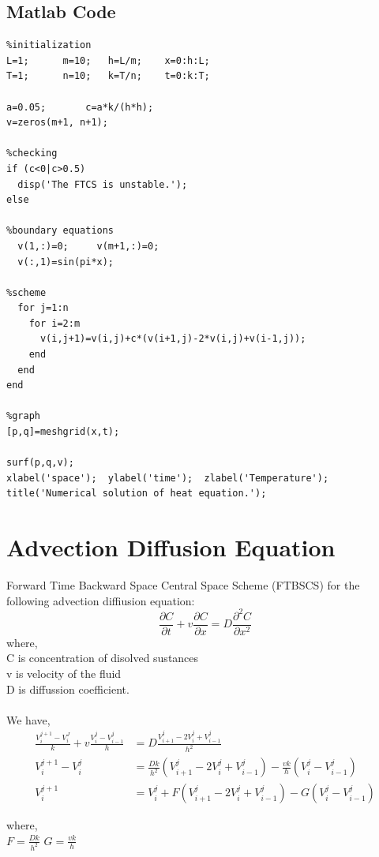 \section{Matlab Code}
  \begin{verbatim}
%initialization
L=1;      m=10;   h=L/m;    x=0:h:L;
T=1;      n=10;   k=T/n;    t=0:k:T;

a=0.05;       c=a*k/(h*h);
v=zeros(m+1, n+1);

%checking
if (c<0|c>0.5)
  disp('The FTCS is unstable.');
else

%boundary equations
  v(1,:)=0;     v(m+1,:)=0;
  v(:,1)=sin(pi*x);

%scheme
  for j=1:n
    for i=2:m
      v(i,j+1)=v(i,j)+c*(v(i+1,j)-2*v(i,j)+v(i-1,j));
    end
  end
end

%graph
[p,q]=meshgrid(x,t);

surf(p,q,v);
xlabel('space');  ylabel('time');  zlabel('Temperature');
title('Numerical solution of heat equation.');
\end{verbatim}

\chapter{Advection Diffusion Equation}
Forward Time Backward Space Central Space Scheme (FTBSCS) for the following advection diffiusion equation:\\
\[\frac{\partial C}{\partial t} + v\frac{\partial C}{\partial x} = D\frac{\partial^2 C}{\partial x^2}\]
where,\\
C is concentration of disolved sustances \\
v is velocity of the fluid \\
D is diffussion coefficient. \\ \\

We have,
\begin{align*}
  \frac{V_i^{j+1}-V_i^J}{k} + v\frac{V_i^j - V_{i-1}^j}{h} &= D\frac{V_{i+1}^j-2V_i^j+V_{i-1}^j}{h^2}\\
  V_i^{j+1}-V_i^j &= \frac{Dk}{h^2}(V_{i+1}^j-2V_i^j+V_{i-1}^j)-\frac{vk}{h}(V_i^j - V_{i-1}^j)\\
  V_i^{j+1} &= V_i^j+F(V_{i+1}^j-2V_i^j+V_{i-1}^j)-G(V_i^j - V_{i-1}^j)
\end{align*}

where,\\
\(F=\frac{Dk}{h^2}\) \hspace{5mm} \(G= \frac{vk}{h}\)

